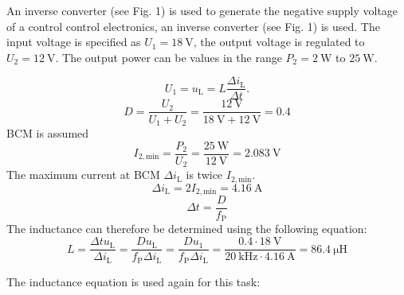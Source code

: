 

An inverse converter (see Fig. 1) is used to generate the negative supply voltage of a control control electronics, an inverse converter (see Fig. 1) is used. The input voltage is specified as $U_\mathrm{1}=\SI{18}{\volt}$, the output voltage is regulated to $U_\mathrm{2}=\SI{12}{\volt}$. The output power can be values in the range $P_\mathrm{2}=\SI{2}{\watt}$ to $\SI{25}{\watt}$.




\begin{solutionblock}
    \begin{equation}
        U_{\mathrm{1}} = u_{\mathrm{L}} = L \frac{\Delta i_{\mathrm{L}} }{\Delta t}. 
    \end{equation}
\begin{equation}
    D = \frac{U_\mathrm{2}}{U_\mathrm{1}+U_\mathrm{2}} = \frac{\SI{12}{\volt}}{\SI{18}{\volt}+\SI{12}{\volt}} = 0.4
\end{equation}
BCM is assumed
\begin{equation}
    I_\mathrm{2,min} = \frac{P_\mathrm{2}}{U_\mathrm{2}}=\frac{\SI{25}{\watt}}{\SI{12}{\volt}}=\SI{2.083}{\volt}
\end{equation}
The maximum current at BCM $\Delta i_{\mathrm{L}}$ is twice  $I_\mathrm{2,min}$.
\begin{equation}
    \Delta i_{\mathrm{L}} = 2  I_\mathrm{2,min} = \SI{4.16}{\ampere}
\end{equation}
\begin{equation}
    \Delta t = \frac{D}{f_\mathrm{P}}
\end{equation}
The inductance can therefore be determined using the following equation:
\begin{equation}
    L = \frac{\Delta t  u_{\mathrm{L}}}{\Delta i_{\mathrm{L}}}= \frac{D u_{\mathrm{L}}}{f_\mathrm{P}\Delta i_{\mathrm{L}}}= \frac{D u_{\mathrm{1}}}{f_\mathrm{P}\Delta i_{\mathrm{L}}} = \frac{0.4 \cdot \SI{18}{\volt}}{\SI{20}{\kilo\hertz}\cdot \SI{4.16}{\ampere }} = \SI{86.4}{\micro\henry}
\end{equation}

\end{solutionblock}

\begin{solutionblock}
    The inductance equation is used again for this task:
    \begin{equation}
        
    \end{equation}
\end{solutionblock}